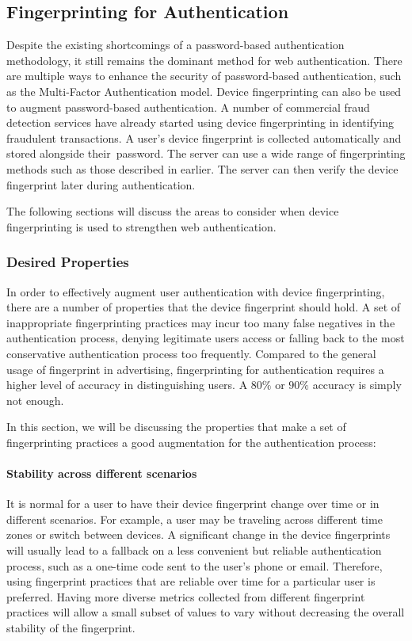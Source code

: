 \documentclass{acm_proc_article-sp}
\begin{document}
\subsection{Fingerprinting for Authentication}
Despite the existing shortcomings of a password-based authentication methodology, it still remains the dominant method for web authentication. There are multiple ways to enhance the security of password-based authentication, such as the Multi-Factor Authentication model. Device fingerprinting can also be used to augment password-based authentication.
A number of commercial fraud detection services have already started using device fingerprinting in identifying fraudulent transactions.\cite{maxmind} \cite{parame} A user's device fingerprint is collected automatically and stored alongside their\ password.  The server can use a wide range of fingerprinting methods such as those described in earlier. The server can then verify the device fingerprint later during authentication.

The following sections will discuss the areas to consider when device fingerprinting is used to strengthen web authentication.


\subsubsection{Desired Properties}
In order to effectively augment user authentication with device fingerprinting, there are a number of properties that the device fingerprint should hold. A set of inappropriate fingerprinting practices may incur too many false negatives in the authentication process, denying legitimate users access or falling back to the most conservative authentication process too frequently. 
Compared to the general usage of fingerprint in advertising, fingerprinting for authentication requires a higher level of accuracy in distinguishing users. A $80\%$ or $90\%$ accuracy is simply not enough. \cite{alca:dev}

In this section, we will be discussing the properties that make a set of fingerprinting practices a good augmentation for the authentication process:

\paragraph{Stability across different scenarios}
It is normal for a user to have their device fingerprint change over time or in different scenarios. For example,  a user may be traveling across different time zones or switch between devices. 
A significant change in the device fingerprints will usually lead to a fallback on a less convenient but reliable authentication process, such as a one-time code sent to the user's phone or email. Therefore, using fingerprint practices that are reliable over time for a particular user is preferred. Having more diverse metrics collected from different fingerprint practices will allow a small subset of values to vary without decreasing the overall stability of the fingerprint.
\end{document}
